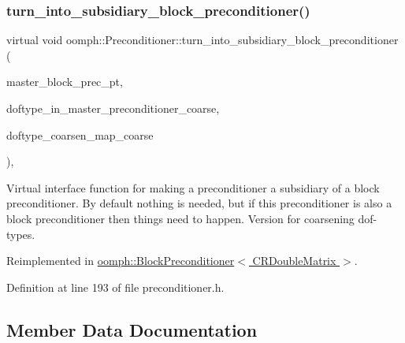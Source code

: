 \subsubsection{\texorpdfstring{turn\+\_\+into\+\_\+subsidiary\+\_\+block\+\_\+preconditioner()}{turn\_into\_subsidiary\_block\_preconditioner()}\hspace{0.1cm}{\footnotesize\ttfamily [2/2]}}
{\footnotesize\ttfamily virtual void oomph\+::\+Preconditioner\+::turn\+\_\+into\+\_\+subsidiary\+\_\+block\+\_\+preconditioner (\begin{DoxyParamCaption}\item[{\hyperlink{classoomph_1_1BlockPreconditioner}{Block\+Preconditioner}$<$ \hyperlink{classoomph_1_1CRDoubleMatrix}{C\+R\+Double\+Matrix} $>$ $\ast$}]{master\+\_\+block\+\_\+prec\+\_\+pt,  }\item[{const \hyperlink{classoomph_1_1Vector}{Vector}$<$ unsigned $>$ \&}]{doftype\+\_\+in\+\_\+master\+\_\+preconditioner\+\_\+coarse,  }\item[{const \hyperlink{classoomph_1_1Vector}{Vector}$<$ \hyperlink{classoomph_1_1Vector}{Vector}$<$ unsigned $>$ $>$ \&}]{doftype\+\_\+coarsen\+\_\+map\+\_\+coarse }\end{DoxyParamCaption})\hspace{0.3cm}{\ttfamily [inline]}, {\ttfamily [virtual]}}

Virtual interface function for making a preconditioner a subsidiary of a block preconditioner. By default nothing is needed, but if this preconditioner is also a block preconditioner then things need to happen. Version for coarsening dof-\/types. 

Reimplemented in \hyperlink{classoomph_1_1BlockPreconditioner_ae9282acaaf19fa2cdb703d49f1a8de25}{oomph\+::\+Block\+Preconditioner$<$ C\+R\+Double\+Matrix $>$}.



Definition at line 193 of file preconditioner.\+h.



\subsection{Member Data Documentation}
\mbox{\label{classoomph_1_1Preconditioner_aa580eb7cc01ac989201aac30c3a8eab5}} 
